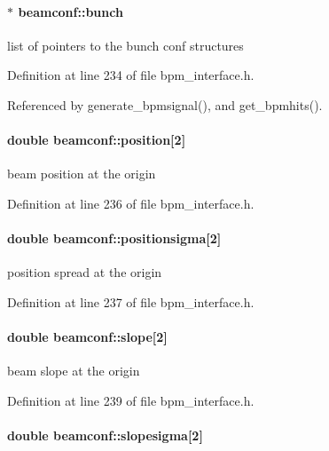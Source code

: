 \paragraph[bunch]{$\ast$ {\bf beamconf::bunch}}\hfill\label{structbeamconf_9ded2879131ef6960f2c63893353c885}


list of pointers to the bunch conf structures 

Definition at line 234 of file bpm\_\-interface.h.

Referenced by generate\_\-bpmsignal(), and get\_\-bpmhits().
\paragraph[position]{\setlength{\rightskip}{0pt plus 5cm}double {\bf beamconf::position}[2]}\hfill\label{structbeamconf_26b00990a201ad20363ff2affe6792fa}


beam position at the origin 

Definition at line 236 of file bpm\_\-interface.h.
\paragraph[positionsigma]{\setlength{\rightskip}{0pt plus 5cm}double {\bf beamconf::positionsigma}[2]}\hfill\label{structbeamconf_3fd6fab4b89235e0a27d3733676f8eca}


position spread at the origin 

Definition at line 237 of file bpm\_\-interface.h.
\paragraph[slope]{\setlength{\rightskip}{0pt plus 5cm}double {\bf beamconf::slope}[2]}\hfill\label{structbeamconf_71c30c68495a26878183645035cb8677}


beam slope at the origin 

Definition at line 239 of file bpm\_\-interface.h.
\paragraph[slopesigma]{\setlength{\rightskip}{0pt plus 5cm}double {\bf beamconf::slopesigma}[2]}\hfill\label{structbeamconf_40ab197475399c5bb01b5abe25dee3d9}


